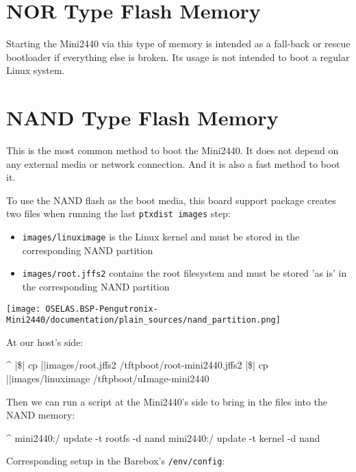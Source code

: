 \section{NOR Type Flash Memory}

Starting the Mini2440 via this type of memory is intended as a fall-back or
rescue bootloader if everything else is broken. Its usage is not intended to
boot a regular Linux system.

\section{NAND Type Flash Memory}				\label{sec:nandflashmem}

This is the most common method to boot the Mini2440. It does not depend on
any external media or network connection. And it is also a fast method to
boot it.

To use the NAND flash as the boot media, this board support package creates
two files when running the last \texttt{ptxdist images} step:

\begin{itemize}
\item \texttt{\ptxdistPlatformDir images/linuximage} is the Linux kernel
	and must be stored in the corresponding NAND partition
\item \texttt{\ptxdistPlatformDir images/root.jffs2} contains the root filesystem
	and must be stored 'as is' in the corresponding NAND partition
\end{itemize}

\centerline{\texttt{[image: OSELAS.BSP-Pengutronix-Mini2440/documentation/plain\_sources/nand\_partition.png]}}

At our host's side:

\begin{ptxshell}[escapechar=|]{^}
|\$| cp |\ptxdistPlatformDir |images/root.jffs2 /tftpboot/root-mini2440.jffs2
|\$| cp |\ptxdistPlatformDir |images/linuximage /tftpboot/uImage-mini2440
\end{ptxshell}

Then we can run a script at the Mini2440's side to bring in the files into the
NAND memory:

\begin{ptxshell}[escapechar=|]{^}
mini2440:/ update -t rootfs -d nand
mini2440:/ update -t kernel -d nand
\end{ptxshell}

Corresponding setup in the Barebox's \texttt{/env/config}:

